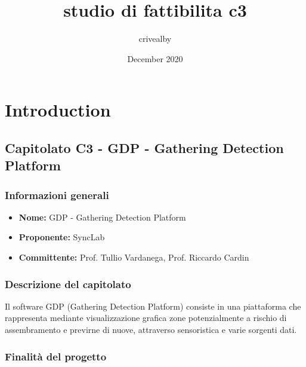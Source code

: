 \documentclass{article}
\title{studio di fattibilita c3}
\author{crivealby }
\date{December 2020}
\begin{document}
\maketitle

\section{Introduction}
\pagebreak
\subsection{Capitolato C3 - GDP - Gathering Detection Platform}


\subsubsection{Informazioni generali}

\begin{itemize}
	\item{\textbf{Nome:}} GDP - Gathering Detection Platform
	\item{\textbf{Proponente:}} SyncLab
	\item{\textbf{Committente:}} Prof. Tullio Vardanega, Prof. Riccardo Cardin
\end{itemize}



\subsubsection{Descrizione del capitolato}

Il software GDP (Gathering Detection Platform) consiste in una piattaforma che rappresenta mediante visualizzazione grafica zone potenzialmente a rischio di assembramento e previrne di nuove, attraverso sensoristica e varie sorgenti dati.


\subsubsection{Finalità del progetto}
\end{document}
